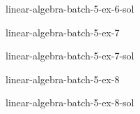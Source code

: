 \documentclass[preview]{standalone}
\begin{document}
\begin{snippetsolution}{linear-algebra-batch-5-ex-6-sol}{}
    \todo
\end{snippetsolution}

\begin{snippetexercise}{linear-algebra-batch-5-ex-7}{}
    \todo
\end{snippetexercise}

\begin{snippetsolution}{linear-algebra-batch-5-ex-7-sol}{}
    \todo
\end{snippetsolution}

\begin{snippetexercise}{linear-algebra-batch-5-ex-8}{}
    \todo
\end{snippetexercise}

\begin{snippetsolution}{linear-algebra-batch-5-ex-8-sol}{}
    \todo
\end{snippetsolution}
\end{document}
